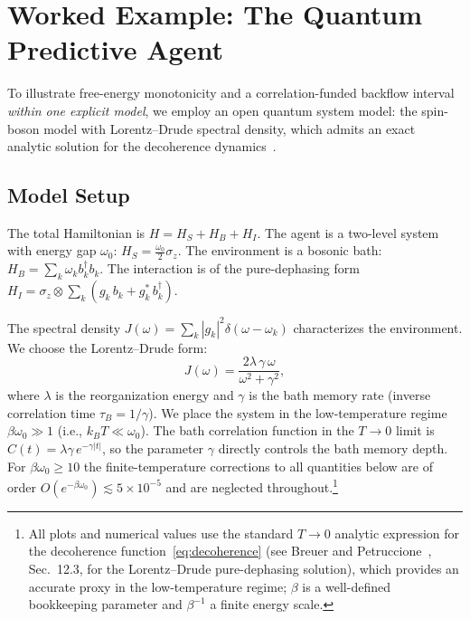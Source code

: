 \documentclass[12pt]{article}
\begin{document}
\section{Worked Example: The Quantum Predictive Agent}
\label{sec:example}

To illustrate free-energy monotonicity and a correlation-funded
backflow interval \emph{within one explicit model}, we employ an open quantum
system model: the spin-boson model with Lorentz--Drude spectral
density, which admits an exact analytic solution for the
decoherence dynamics~\cite{BreuerPetruccione2002}.

\subsection{Model Setup}

The total Hamiltonian is $H = H_S + H_B + H_I$.
The agent is a two-level system with energy gap $\omega_0$:
$H_S = \tfrac{\omega_0}{2}\sigma_z$.
The environment is a bosonic bath:
$H_B = \sum_k \omega_k b_k^\dagger b_k$.
The interaction is of the pure-dephasing form
$H_I = \sigma_z \otimes \sum_k (g_k\, b_k
+ g_k^*\, b_k^\dagger)$.

The spectral density
$J(\omega) = \sum_k |g_k|^2 \delta(\omega - \omega_k)$
characterizes the environment. We choose the Lorentz--Drude form:
\begin{equation}
\label{eq:lorentz_drude}
J(\omega) = \frac{2\lambda\, \gamma\, \omega}
  {\omega^2 + \gamma^2},
\end{equation}
where $\lambda$ is the reorganization energy and $\gamma$ is the
bath memory rate (inverse correlation time
$\tau_B = 1/\gamma$).
We place the system in the low-temperature regime
$\beta\omega_0 \gg 1$ (i.e., $k_BT \ll \omega_0$).
The bath correlation function in the $T \to 0$ limit is
$C(t) = \lambda\gamma\, e^{-\gamma|t|}$, so the parameter
$\gamma$ directly controls the bath memory depth.
For $\beta\omega_0 \geq 10$ the finite-temperature corrections
to all quantities below are of order
$O(e^{-\beta\omega_0}) \lesssim 5 \times 10^{-5}$ and
are neglected throughout.\footnote{All plots and numerical values
use the standard $T \to 0$ analytic expression for the
decoherence function~\eqref{eq:decoherence}
(see Breuer and Petruccione~\cite{BreuerPetruccione2002},
Sec.~12.3, for the Lorentz--Drude pure-dephasing solution),
which provides an accurate proxy in the low-temperature
regime;
$\beta$ is a well-defined bookkeeping parameter and
$\beta^{-1}$ a finite energy scale.}
\end{document}
